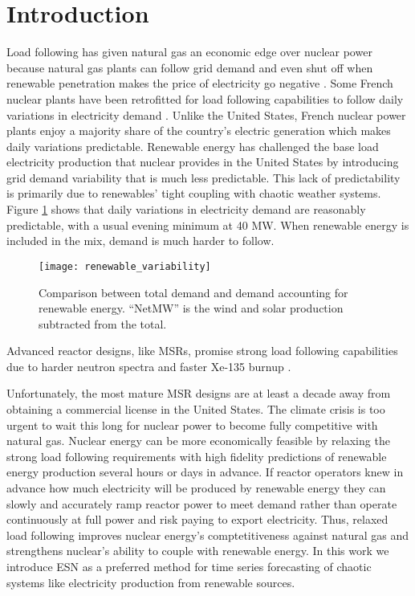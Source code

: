 \section{Introduction}

Load following has given natural gas an economic edge over nuclear power
because natural gas plants can follow grid demand and even shut off when
renewable penetration makes the
price of electricity go negative \cite{keppler_carbon_2011}. Some French nuclear
plants have been retrofitted for load following capabilities to follow daily
variations in electricity demand \cite{lokhov_technical_2011}. Unlike the United
States, French nuclear power plants enjoy a majority share of the country's
electric generation which makes daily variations predictable. Renewable energy
has challenged the base load electricity production that
nuclear provides in the United States by introducing grid demand variability
that is much less predictable. This lack of predictability is primarily due to
renewables' tight coupling with chaotic weather systems. Figure \ref{fig:vre}
shows
that daily variations in electricity demand are reasonably predictable, with a
usual evening minimum at 40 MW. When renewable energy is included in the mix,
demand is much harder to follow.

\begin{figure}[h]
  \centering
  \texttt{[image: renewable\_variability]}
  \caption{Comparison between total demand and demand accounting for renewable
   energy. ``NetMW'' is the wind and solar production subtracted from the
   total.}
  \label{fig:vre}
\end{figure}

Advanced reactor designs, like \glspl{MSR}, promise strong load following
capabilities due to harder
neutron spectra and faster Xe-135 burnup \cite{rykhlevskii_impact_2019}.

Unfortunately, the most mature MSR
designs are at least a decade away from obtaining a commercial license in the
United States. The climate crisis is too urgent to wait this long for nuclear
power to become fully competitive with natural gas.
Nuclear energy can be more economically feasible by relaxing the strong load
following requirements
with high fidelity predictions of renewable energy production several hours or
days in advance. If reactor operators knew in advance how much electricity will
be produced by renewable energy they
can slowly and accurately ramp reactor power to meet demand rather than operate
continuously at full power and risk paying to export electricity. Thus, relaxed
load following
improves nuclear energy's comptetitiveness against natural gas and
strengthens nuclear's ability to couple with renewable energy.
In this work we introduce \acrfull{ESN} as a preferred method for time
series forecasting of chaotic systems like electricity
production from renewable sources.

